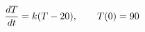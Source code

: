 \documentclass[preview]{standalone}
\begin{document}
\begin{align*}
\special{dvisvgm:raw <g id='unique000'>}\frac{dT}{dt} = k(T - 20), \qquad T(0) = 90\special{dvisvgm:raw </g>}
\end{align*}
\end{document}
